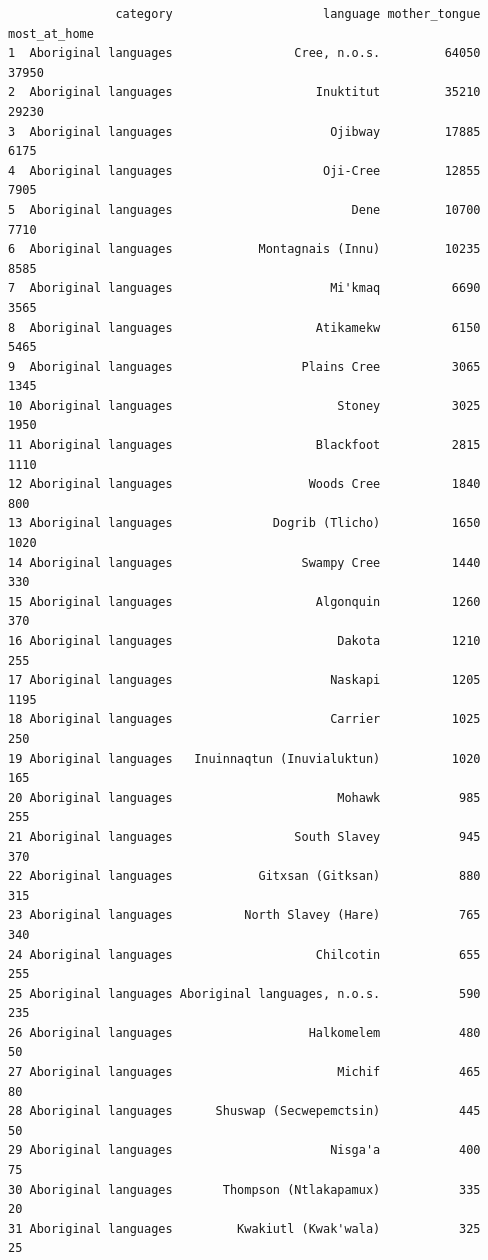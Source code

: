 \documentclass[
  letterpaper,
  DIV=11,
  numbers=noendperiod]{scrartcl}
\begin{document}
\begin{verbatim}
               category                     language mother_tongue most_at_home
1  Aboriginal languages                 Cree, n.o.s.         64050        37950
2  Aboriginal languages                    Inuktitut         35210        29230
3  Aboriginal languages                      Ojibway         17885         6175
4  Aboriginal languages                     Oji-Cree         12855         7905
5  Aboriginal languages                         Dene         10700         7710
6  Aboriginal languages            Montagnais (Innu)         10235         8585
7  Aboriginal languages                      Mi'kmaq          6690         3565
8  Aboriginal languages                    Atikamekw          6150         5465
9  Aboriginal languages                  Plains Cree          3065         1345
10 Aboriginal languages                       Stoney          3025         1950
11 Aboriginal languages                    Blackfoot          2815         1110
12 Aboriginal languages                   Woods Cree          1840          800
13 Aboriginal languages              Dogrib (Tlicho)          1650         1020
14 Aboriginal languages                  Swampy Cree          1440          330
15 Aboriginal languages                    Algonquin          1260          370
16 Aboriginal languages                       Dakota          1210          255
17 Aboriginal languages                      Naskapi          1205         1195
18 Aboriginal languages                      Carrier          1025          250
19 Aboriginal languages   Inuinnaqtun (Inuvialuktun)          1020          165
20 Aboriginal languages                       Mohawk           985          255
21 Aboriginal languages                 South Slavey           945          370
22 Aboriginal languages            Gitxsan (Gitksan)           880          315
23 Aboriginal languages          North Slavey (Hare)           765          340
24 Aboriginal languages                    Chilcotin           655          255
25 Aboriginal languages Aboriginal languages, n.o.s.           590          235
26 Aboriginal languages                   Halkomelem           480           50
27 Aboriginal languages                       Michif           465           80
28 Aboriginal languages      Shuswap (Secwepemctsin)           445           50
29 Aboriginal languages                      Nisga'a           400           75
30 Aboriginal languages       Thompson (Ntlakapamux)           335           20
31 Aboriginal languages         Kwakiutl (Kwak'wala)           325           25

\end{verbatim}
\end{document}
